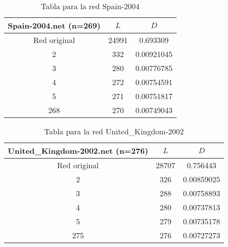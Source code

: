 \begin{minipage}{0.5\textwidth}
\begin{table}[H]
  \caption{Tabla para la red Spain-2004}
  \begin{tabular}{ccc}
    \hline
    Spain-2004.net
    (n=269)              &   $L$ &   $D$ \\
    \hline
    Red original &               24991 & 0.693309   \\
    2            &                 332 & 0.00921045 \\
    3            &                 280 & 0.00776785 \\
    4            &                 272 & 0.00754591 \\
    5            &                 271 & 0.00751817 \\
    268          &                 270 & 0.00749043 \\
    \hline
  \end{tabular}
\end{table}
\end{minipage}

\begin{minipage}{0.5\textwidth}
\begin{table}[H]
  \caption{Tabla para la red United\_Kingdom-2002}
  \begin{tabular}{ccc}
    \hline
    United\_Kingdom-2002.net
    (n=276)              &   $L$ &   $D$ \\
    \hline
    Red original &               28707 & 0.756443   \\
    2            &                 326 & 0.00859025 \\
    3            &                 288 & 0.00758893 \\
    4            &                 280 & 0.00737813 \\
    5            &                 279 & 0.00735178 \\
    275          &                 276 & 0.00727273 \\
    \hline
  \end{tabular}
\end{table}
\end{minipage}

